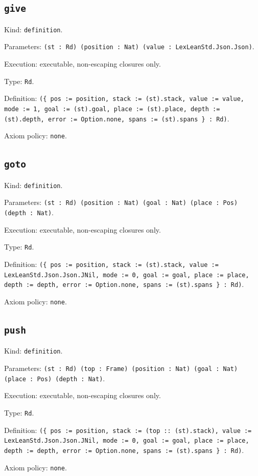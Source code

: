 \documentclass[11pt]{article}
\begin{document}
\subsection*{\texttt{give}}
\noindent Kind: \texttt{definition}.\par
\noindent Parameters: \texttt{(st : Rd) (position : Nat) (value : LexLeanStd.Json.Json)}.\par
\noindent Execution: executable, non-escaping closures only.\par
\noindent Type: \texttt{Rd}.\par
\noindent Definition: \texttt{(\{ pos := position, stack := (st).stack, value := value, mode := 1, goal := (st).goal, place := (st).place, depth := (st).depth, error := Option.none, spans := (st).spans \} : Rd)}.\par
\noindent Axiom policy: \texttt{none}.\par
\subsection*{\texttt{goto}}
\noindent Kind: \texttt{definition}.\par
\noindent Parameters: \texttt{(st : Rd) (position : Nat) (goal : Nat) (place : Pos) (depth : Nat)}.\par
\noindent Execution: executable, non-escaping closures only.\par
\noindent Type: \texttt{Rd}.\par
\noindent Definition: \texttt{(\{ pos := position, stack := (st).stack, value := LexLeanStd.Json.Json.JNil, mode := 0, goal := goal, place := place, depth := depth, error := Option.none, spans := (st).spans \} : Rd)}.\par
\noindent Axiom policy: \texttt{none}.\par
\subsection*{\texttt{push}}
\noindent Kind: \texttt{definition}.\par
\noindent Parameters: \texttt{(st : Rd) (top : Frame) (position : Nat) (goal : Nat) (place : Pos) (depth : Nat)}.\par
\noindent Execution: executable, non-escaping closures only.\par
\noindent Type: \texttt{Rd}.\par
\noindent Definition: \texttt{(\{ pos := position, stack := (top :: (st).stack), value := LexLeanStd.Json.Json.JNil, mode := 0, goal := goal, place := place, depth := depth, error := Option.none, spans := (st).spans \} : Rd)}.\par
\noindent Axiom policy: \texttt{none}.\par
\end{document}
